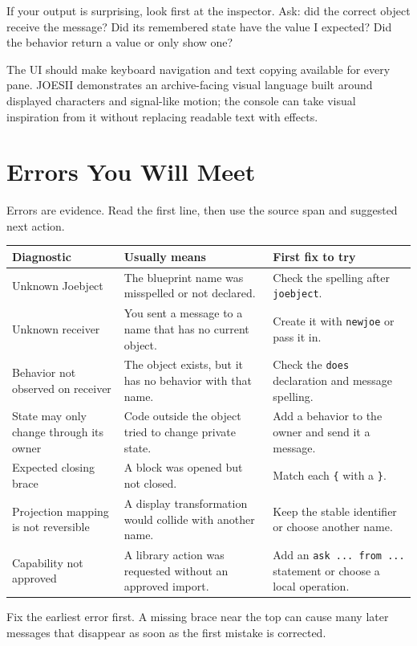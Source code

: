 \documentclass[12pt]{article}
\newcommand{\kw}[1]{\texttt{#1}}
\begin{document}
If your output is surprising, look first at the inspector. Ask: did the correct object receive the message? Did its remembered state have the value I expected? Did the behavior return a value or only show one?

The UI should make keyboard navigation and text copying available for every pane. JOESII demonstrates an archive-facing visual language built around displayed characters and signal-like motion; the console can take visual inspiration from it without replacing readable text with effects.\cite{joesii}

\clearpage
\section{Errors You Will Meet}
Errors are evidence. Read the first line, then use the source span and suggested next action.

\begin{longtable}{p{}p{}p{}}
\toprule
\textbf{Diagnostic} & \textbf{Usually means} & \textbf{First fix to try}\\
\midrule
\endhead
Unknown Joebject & The blueprint name was misspelled or not declared. & Check the spelling after \kw{joebject}.\\
Unknown receiver & You sent a message to a name that has no current object. & Create it with \kw{newjoe} or pass it in.\\
Behavior not observed on receiver & The object exists, but it has no behavior with that name. & Check the \kw{does} declaration and message spelling.\\
State may only change through its owner & Code outside the object tried to change private state. & Add a behavior to the owner and send it a message.\\
Expected closing brace & A block was opened but not closed. & Match each \kw{\{} with a \kw{\}}.\\
Projection mapping is not reversible & A display transformation would collide with another name. & Keep the stable identifier or choose another name.\\
Capability not approved & A library action was requested without an approved import. & Add an \kw{ask ... from ...} statement or choose a local operation.\\
\bottomrule
\end{longtable}

\begin{tipbox}
Fix the earliest error first. A missing brace near the top can cause many later messages that disappear as soon as the first mistake is corrected.
\end{tipbox}
\end{document}
